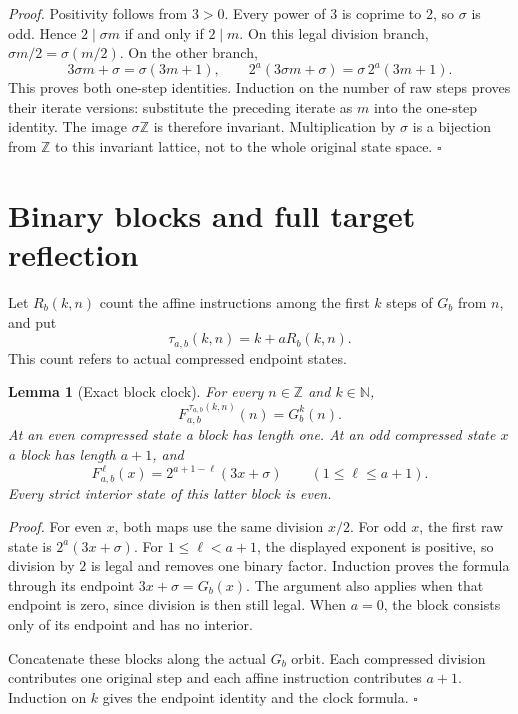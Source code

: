 \documentclass[11pt,letterpaper]{article}
\newcommand{\N}{\mathbb{N}}
\newcommand{\Z}{\mathbb{Z}}
\newtheorem{lemma}[theorem]{Lemma}
\newenvironment{proof}{\noindent\textit{Proof.}}{\hfill\(\square\)}
\begin{document}
\begin{proof}
Positivity follows from \(3>0\). Every power of \(3\) is coprime to \(2\),
so \(\sigma\) is odd. Hence \(2\mid\sigma m\) if and only if \(2\mid m\).
On this legal division branch, \(\sigma m/2=\sigma(m/2)\).
On the other branch,
\[
3\sigma m+\sigma=\sigma(3m+1),
\qquad
2^a(3\sigma m+\sigma)=\sigma\,2^a(3m+1).
\]
This proves both one-step identities. Induction on the number of raw
steps proves their iterate versions: substitute the preceding iterate
as \(m\) into the one-step identity. The image \(\sigma\Z\) is therefore
invariant. Multiplication by \(\sigma\) is a bijection from \(\Z\) to
this invariant lattice, not to the whole original state space.
\end{proof}

\section{Binary blocks and full target reflection}

Let \(R_b(k,n)\) count the affine instructions among the first \(k\)
steps of \(G_b\) from \(n\), and put
\[
\tau_{a,b}(k,n)=k+aR_b(k,n).
\]
This count refers to actual compressed endpoint states.

\begin{lemma}[Exact block clock]\label{BlockClock}
For every \(n\in\Z\) and \(k\in\N\),
\[
F_{a,b}^{\,\tau_{a,b}(k,n)}(n)=G_b^k(n).
\]
At an even compressed state a block has length one.
At an odd compressed state \(x\) a block has length \(a+1\), and
\[
F_{a,b}^{\,\ell}(x)=2^{a+1-\ell}(3x+\sigma)
\qquad(1\le\ell\le a+1).
\]
Every strict interior state of this latter block is even.
\end{lemma}

\begin{proof}
For even \(x\), both maps use the same division \(x/2\).
For odd \(x\), the first raw state is \(2^a(3x+\sigma)\).
For \(1\le\ell<a+1\), the displayed exponent is positive, so division by
\(2\) is legal and removes one binary factor. Induction proves the formula
through its endpoint \(3x+\sigma=G_b(x)\). The argument also applies when
that endpoint is zero, since division is then still legal.
When \(a=0\), the block consists only of its endpoint and has no interior.

Concatenate these blocks along the actual \(G_b\) orbit.
Each compressed division contributes one original step and each affine
instruction contributes \(a+1\). Induction on \(k\) gives the endpoint
identity and the clock formula.
\end{proof}
\end{document}
